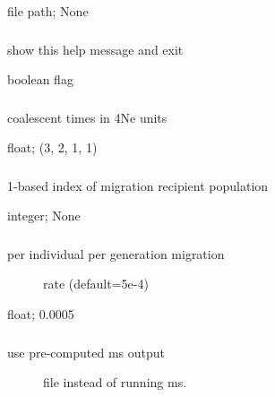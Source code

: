 \documentclass[letterpaper,12pt,english]{sphinxmanual}
\begin{document}
 file path;  None


\subsubsection{}
\label{\detokenize{prog_desc:id3}}
 show this help message and exit

 boolean flag


\subsubsection{}
\label{\detokenize{prog_desc:coaltimes}}
 coalescent times in 4Ne units

 float;  (3, 2, 1, 1)


\subsubsection{}
\label{\detokenize{prog_desc:mdest}}
 1-based index of migration recipient population

 integer;  None


\subsubsection{}
\label{\detokenize{prog_desc:mrate}}\begin{description}
\item[{ per individual per generation migration}] \leavevmode
rate (default=5e-4)

\end{description}

 float;  0.0005


\subsubsection{}
\label{\detokenize{prog_desc:msfile}}\begin{description}
\item[{ use pre-computed ms output}] \leavevmode
file instead of running ms.

\end{description}
\end{document}
